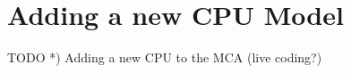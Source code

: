 
\section{Adding a new CPU Model}


\begin{frame}{TODO}
*) Adding a new CPU to the MCA (live coding?)\\
\end{frame}

